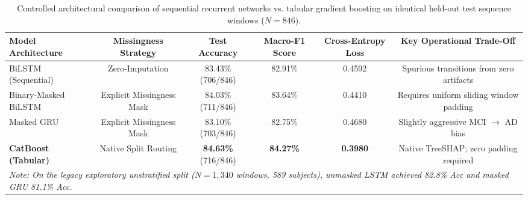 \begin{table}[t]
\centering
\caption{Controlled architectural comparison of sequential recurrent networks vs. tabular gradient boosting on identical held-out test sequence windows ($N = 846$).}
\label{tab:seq_model_compare}
\small
\begin{adjustbox}{max width=\linewidth}
\begin{tabular}{lccccc}
\toprule
\textbf{Model Architecture} & \textbf{Missingness Strategy} & \textbf{Test Accuracy} & \textbf{Macro-F1 Score} & \textbf{Cross-Entropy Loss} & \textbf{Key Operational Trade-Off} \\
\midrule
BiLSTM (Sequential)         & Zero-Imputation               & 83.43\% (706/846)      & 82.91\%                 & 0.4592                      & Spurious transitions from zero artifacts \\
Binary-Masked BiLSTM        & Explicit Missingness Mask     & 84.03\% (711/846)      & 83.64\%                 & 0.4410                      & Requires uniform sliding window padding \\
Masked GRU                  & Explicit Missingness Mask     & 83.10\% (703/846)      & 82.75\%                 & 0.4680                      & Slightly aggressive MCI $\to$ AD bias \\
\textbf{CatBoost (Tabular)} & Native Split Routing          & \textbf{84.63\%} (716/846) & \textbf{84.27\%}    & \textbf{0.3980}             & Native TreeSHAP; zero padding required \\
\midrule
\multicolumn{6}{l}{\textit{Note: On the legacy exploratory unstratified split ($N = 1,340$ windows, 589 subjects), unmasked LSTM achieved 82.8\% Acc and masked GRU 81.1\% Acc.}} \\
\bottomrule
\end{tabular}
\end{adjustbox}
\end{table}
